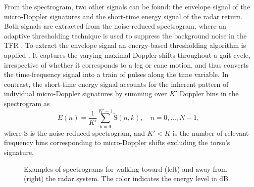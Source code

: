 From the spectrogram, two other signals can be found: the envelope signal of the micro-Doppler signatures and the short-time energy signal of the radar return. Both signals are extracted from the noise-reduced spectrogram, where an adaptive thresholding technique is used to suppress the background noise in the TFR \cite{Kim09}. To extract the envelope signal an energy-based thresholding algorithm is applied \cite{Ero16}. It captures the varying maximal Doppler shifts throughout a gait cycle, irrespective of whether it corresponds to a leg or cane motion, and thus converts the time-frequency signal into a train of pulses along the time variable. In contrast, the short-time energy signal accounts for the inherent pattern of individual micro-Doppler signatures by summing over $K'$ Doppler bins in the spectrogram as
\begin{equation}\label{eq:meanEnergy}
E(n) = \frac{1}{K'} \sum_{k=0}^{K'-1} \tilde{\mathrm{S}}(n,k), \quad n = 0, \dots, N-1,
\end{equation}
where $\tilde{\mathrm{S}}$ is the noise-reduced spectrogram, and $K' < K$ is the number of relevant frequency bins corresponding to micro-Doppler shifts excluding the torso's signature.

\begin{figure}[!t]
	\vspace{-1em}



	\caption{Examples of spectrograms for walking toward (left) and away from (right) the radar system. The color indicates the energy level in dB.}
	\label{fig:specs}\vspace{-0.5em}
\end{figure}


